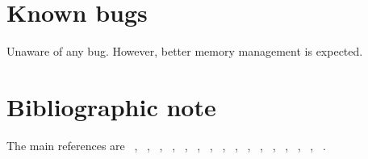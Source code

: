 \documentclass[11pt,a4paper]{article}
\begin{document}
\section{Known bugs}

Unaware of any bug. However, better memory management is expected.

\section{Bibliographic note}

The main references are ~\cite{chow60}, ~\cite{guo92}, ~\cite{gholamic94},
~\cite{risch96}, ~\cite{spielman96}, ~\cite{risch97}, ~\cite{miller97}, ~\cite{sham97}, 
~\cite{sham98}, ~\cite{devlin99}, ~\cite{zhao99}, ~\cite{guo00}, 
~\cite{hirotsu01}, ~\cite{zhao02}, ~\cite{zaykin02}, ~\cite{zhao04}.


\end{document}

